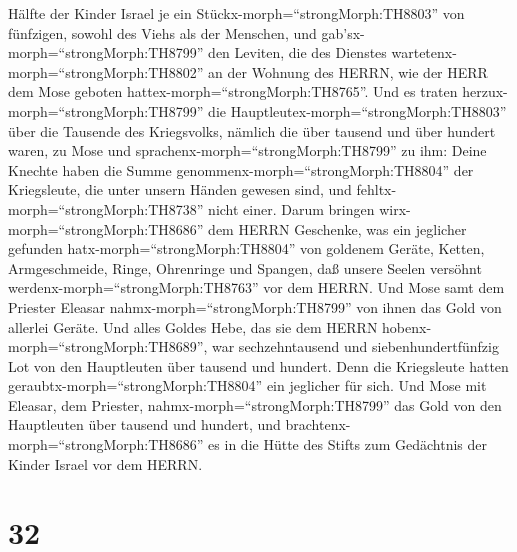 Hälfte der Kinder Israel je ein Stückx-morph=``strongMorph:TH8803'' von
fünfzigen, sowohl des Viehs als der Menschen, und
gab'sx-morph=``strongMorph:TH8799'' den Leviten, die des Dienstes
wartetenx-morph=``strongMorph:TH8802'' an der Wohnung des HERRN, wie der
HERR dem Mose geboten hattex-morph=``strongMorph:TH8765''. 
Und es traten herzux-morph=``strongMorph:TH8799'' die
Hauptleutex-morph=``strongMorph:TH8803'' über die Tausende des
Kriegsvolks, nämlich die über tausend und über hundert waren, zu Mose
 und sprachenx-morph=``strongMorph:TH8799'' zu ihm: Deine
Knechte haben die Summe genommenx-morph=``strongMorph:TH8804'' der
Kriegsleute, die unter unsern Händen gewesen sind, und
fehltx-morph=``strongMorph:TH8738'' nicht einer.  Darum
bringen wirx-morph=``strongMorph:TH8686'' dem HERRN Geschenke, was ein
jeglicher gefunden hatx-morph=``strongMorph:TH8804'' von goldenem
Geräte, Ketten, Armgeschmeide, Ringe, Ohrenringe und Spangen, daß unsere
Seelen versöhnt werdenx-morph=``strongMorph:TH8763'' vor dem HERRN.
 Und Mose samt dem Priester Eleasar
nahmx-morph=``strongMorph:TH8799'' von ihnen das Gold von allerlei
Geräte.  Und alles Goldes Hebe, das sie dem HERRN
hobenx-morph=``strongMorph:TH8689'', war sechzehntausend und
siebenhundertfünfzig Lot von den Hauptleuten über tausend und hundert.
 Denn die Kriegsleute hatten
geraubtx-morph=``strongMorph:TH8804'' ein jeglicher für sich.
 Und Mose mit Eleasar, dem Priester,
nahmx-morph=``strongMorph:TH8799'' das Gold von den Hauptleuten über
tausend und hundert, und brachtenx-morph=``strongMorph:TH8686'' es in
die Hütte des Stifts zum Gedächtnis der Kinder Israel vor dem HERRN.

\hypertarget{section-31}{%
\section{32}\label{section-31}}

